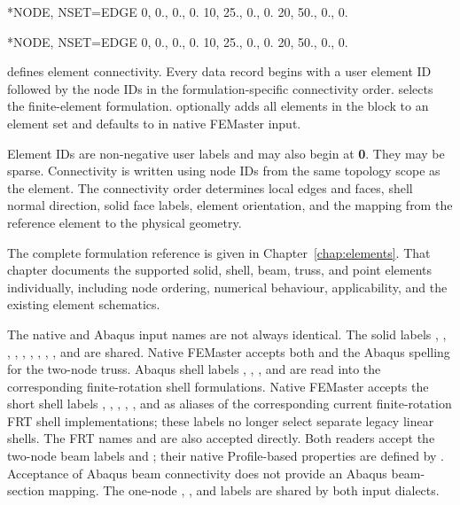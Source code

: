 \exampleheading

\begin{dialectexamples}
\begin{femasterdeck}
*NODE, NSET=EDGE
0,  0., 0., 0.
10, 25., 0., 0.
20, 50., 0., 0.
\end{femasterdeck}
\begin{abaqusdeck}
*NODE, NSET=EDGE
0,  0., 0., 0.
10, 25., 0., 0.
20, 50., 0., 0.
\end{abaqusdeck}
\end{dialectexamples}


 defines element connectivity. Every data record begins with a user element ID followed by the node IDs in the formulation-specific connectivity order.  selects the finite-element formulation.  optionally adds all elements in the block to an element set and defaults to  in native FEMaster input.

Element IDs are non-negative user labels and may also begin at \textbf{0}. They may be sparse. Connectivity is written using node IDs from the same topology scope as the element. The connectivity order determines local edges and faces, shell normal direction, solid face labels, element orientation, and the mapping from the reference element to the physical geometry.

The complete formulation reference is given in Chapter~\ref{chap:elements}. That chapter documents the supported solid, shell, beam, truss, and point elements individually, including node ordering, numerical behaviour, applicability, and the existing element schematics.

The native and Abaqus input names are not always identical. The solid labels , , , , , , , , , and  are shared. Native FEMaster accepts both  and the Abaqus spelling  for the two-node truss. Abaqus shell labels , , , and  are read into the corresponding finite-rotation shell formulations. Native FEMaster accepts the short shell labels , , , , , and  as aliases of the corresponding current finite-rotation FRT shell implementations; these labels no longer select separate legacy linear shells. The FRT names and  are also accepted directly. Both readers accept the two-node beam labels  and ; their native Profile-based properties are defined by . Acceptance of Abaqus beam connectivity does not provide an Abaqus beam-section mapping. The one-node , , and  labels are shared by both input dialects.

